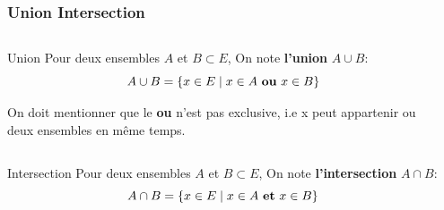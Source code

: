 \documentclass{beamer}
\begin{document}
\begin{frame}[t]
  \frametitle{Union Intersection}
  
  \small
  \begin{columns}
    \begin{column}{0.7\textwidth}
     \begin{block}{Union}
       Pour deux ensembles $A$ et $B \subset E$, On note \textbf{\alert{l'union}} $A\cup
         B$:
         \begin{equation}
           A\cup B = \left\{ x \in E\;|\; x\in A\text{ \textbf{ou} } x\in B\right\} 
         \end{equation}
     \end{block} 
     {\scriptsize
     On doit mentionner que le \textbf{ou} n'est pas exclusive, i.e x peut
   appartenir ou deux ensembles en même temps.}
    \end{column}
    \begin{column}{0.3\textwidth}
     \begin{center}
       
     \end{center}
    \end{column}
  \end{columns}

  \vspace*{1cm}
  \begin{columns}
    \begin{column}{0.7\textwidth}
     \begin{block}{Intersection}
       Pour deux ensembles $A$ et $B \subset E$, On note
       \textbf{\alert{l'intersection}} $A\cap
         B$:
         \begin{equation}
           A\cap B = \left\{ x \in E\;|\; x\in A\text{ \textbf{et} } x\in B\right\} 
         \end{equation}
     \end{block} 
    \end{column}
    \begin{column}{0.3\textwidth}
     \begin{center}
       

\end{center}
\end{column}
\end{columns}
\end{frame}
\end{document}
